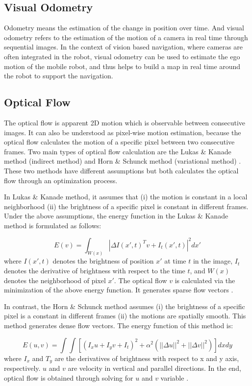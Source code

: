 \documentclass{easychair}
\begin{document}
\subsection{Visual Odometry}
Odometry means the estimation of the change in position over time. And visual odometry refers to the estimation of the motion of a camera in real time through sequential images. In the context of vision based navigation, where cameras are often integrated in the robot, visual odometry can be used to estimate the ego motion of the mobile robot, and thus helps to build a map in real time around the robot to support the navigation.

\subsection{Optical Flow} The optical flow is apparent 2D motion which is observable between consecutive images. It can also be understood as pixel-wise motion estimation, because the optical flow calculates the motion of a specific pixel between two consecutive frames. Two main types of optical flow calculation are the Lukas \& Kanade method (indirect method) and Horn \& Schunck method (variational method) \cite{lukas} \cite{horn}. These two methods have different assumptions but both calculates the optical flow through an optimization process.

In Lukas \& Kanade method, it assumes that (i) the motion is constant in a local neighborhood (ii) the brightness of a specific pixel is constant in different frames. Under the above assumptions, the energy function in the Lukas \& Kanade method is formulated as follows:

\begin{equation}
E(v) = \int_{W(x)} |\Delta I(x', t)^Tv + I_t(x',t) |^2dx'
\end{equation}
\noindent
where $I(x',t)$ denotes the brightness of position $x'$ at time $t$ in the image, $I_t$ denotes the derivative of brightness with respect to the time $t$, and $W(x)$ denotes the neighborhood of pixel $x'$. The optical flow $v$ is calculated via the minimization of the above energy function. It generates sparse flow vectors \cite{lukas}.

In contrast, the Horn \& Schunck method assumes (i) the brightness of a specific pixel is a constant in different frames (ii) the motions are spatially smooth. This method generates dense flow vectors. The energy function of this method is:

\begin{equation}
E(u,v) = \int\int[(I_xu + I_yv + I_t)^2+\alpha^2(||\Delta u ||^2 + ||\Delta v ||^2)]dxdy
\end{equation} 
\noindent
where $I_x$ and $T_y$ are the derivatives of brightness with respect to x and y axis, respectively. $u$ and $v$ are velocity in vertical and parallel directions. In the end, optical flow is obtained through solving for $u$ and $v$ variable \cite{horn}.		
\end{document}
